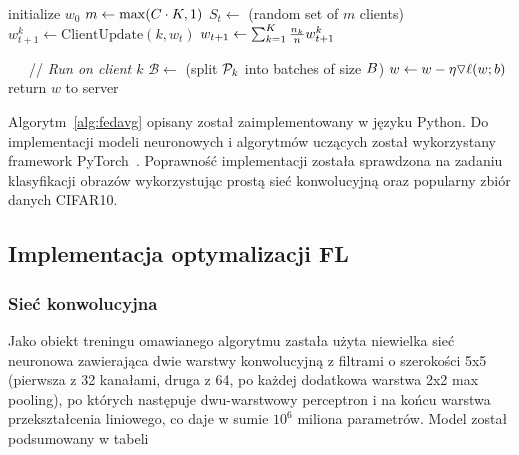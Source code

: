   \begin{polishalgorithm}[t]
    \begin{algorithmic}
      \STATE{} initialize $w_0$
        \STATE{} $m \leftarrow \max(C\cdot K, 1)$
        \STATE{} $S_t \leftarrow$ (random set of $m$ clients)
          \STATE{} $w_{t+1}^k \leftarrow \text{ClientUpdate}(k, w_t)$ 
        \ENDFOR{}
        \STATE{} $w_{t+1} \leftarrow \sum_{k=1}^K \frac{n_k}{n} w_{t+1}^k$
      \ENDFOR{}
      \STATE{}
    
    \ \ \  // \emph{Run on client $k$}
      \STATE{} $\mathcal{B} \leftarrow$ (split $\mathcal{P}_k$ into batches of size $B$)
          \STATE{} $w \leftarrow w - \eta \triangledown \ell(w; b)$
        \ENDFOR{}
    \ENDFOR{}
    \STATE{} return $w$ to server
    \end{algorithmic}
    \label{alg:fedavg}
    \end{polishalgorithm}


  Algorytm~\ref{alg:fedavg} opisany został zaimplementowany w języku Python. Do implementacji modeli
  neuronowych i algorytmów uczących został wykorzystany framework
  PyTorch~\cite{paszke2017automatic}. Poprawność implementacji została sprawdzona na zadaniu klasyfikacji obrazów wykorzystując prostą sieć konwolucyjną oraz popularny zbiór danych CIFAR10. 

  \subsection{Implementacja optymalizacji FL}
  \subsubsection{Sieć konwolucyjna}

  Jako obiekt treningu omawianego algorytmu zastała użyta niewielka sieć neuronowa zawierająca
  dwie warstwy konwolucyjną z filtrami o szerokości 5x5 (pierwsza z 32 kanałami, druga z 64, po
  każdej dodatkowa warstwa 2x2 max pooling), po których następuje dwu-warstwowy perceptron i na
  końcu warstwa przekształcenia liniowego, co daje w sumie \(10^6\) miliona parametrów. Model został podsumowany w tabeli 



